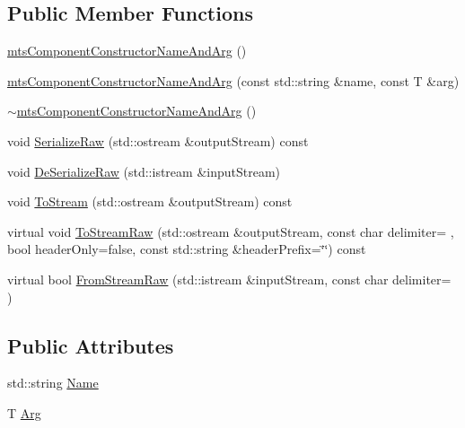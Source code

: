 \subsection*{Public Member Functions}
\begin{DoxyCompactItemize}
\item 
\hyperlink{classmts_component_constructor_name_and_arg_ac2dde2890f4500a118dfce57ecb3aa88}{mts\+Component\+Constructor\+Name\+And\+Arg} ()
\item 
\hyperlink{classmts_component_constructor_name_and_arg_a4b165f0adb89cda1e4534e3ce35a94e4}{mts\+Component\+Constructor\+Name\+And\+Arg} (const std\+::string \&name, const T \&arg)
\item 
\hyperlink{classmts_component_constructor_name_and_arg_acf809e1858750f22f7848226aace1b93}{$\sim$mts\+Component\+Constructor\+Name\+And\+Arg} ()
\item 
void \hyperlink{classmts_component_constructor_name_and_arg_a3531417cca046597939078ae0f60d84c}{Serialize\+Raw} (std\+::ostream \&output\+Stream) const 
\item 
void \hyperlink{classmts_component_constructor_name_and_arg_a3a81e128d43f1aefba3e92b545c50104}{De\+Serialize\+Raw} (std\+::istream \&input\+Stream)
\item 
void \hyperlink{classmts_component_constructor_name_and_arg_ac87df999cdaf708d9c6d07e6c9f9a1e8}{To\+Stream} (std\+::ostream \&output\+Stream) const 
\item 
virtual void \hyperlink{classmts_component_constructor_name_and_arg_a9fb0305f074d11a5473d56fc204c6e04}{To\+Stream\+Raw} (std\+::ostream \&output\+Stream, const char delimiter= \textquotesingle{} \textquotesingle{}, bool header\+Only=false, const std\+::string \&header\+Prefix=\char`\"{}\char`\"{}) const 
\item 
virtual bool \hyperlink{classmts_component_constructor_name_and_arg_ab72fc2e2727e3dfb442cb2259937ebee}{From\+Stream\+Raw} (std\+::istream \&input\+Stream, const char delimiter= \textquotesingle{} \textquotesingle{})
\end{DoxyCompactItemize}
\subsection*{Public Attributes}
\begin{DoxyCompactItemize}
\item 
std\+::string \hyperlink{classmts_component_constructor_name_and_arg_ad9cb127f100da531c3aac4b949f7aa73}{Name}
\item 
T \hyperlink{classmts_component_constructor_name_and_arg_ac44dbfc39967fa6841d24e575c8ea1fb}{Arg}
\end{DoxyCompactItemize}


